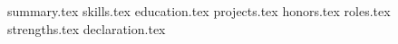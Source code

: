\documentclass[12pt, a4paper]{awesome-cv}
\newcommand*{\sectiondir}{resume/}
\begin{document}
\makecvheader

{summary.tex}
{skills.tex}
{education.tex}
{projects.tex}
{honors.tex}
{roles.tex}
{strengths.tex}
{declaration.tex}
\end{document}
